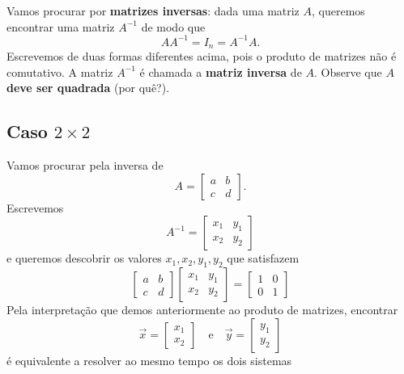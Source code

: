 Vamos procurar por \textbf{matrizes inversas}: dada uma matriz $A$, queremos encontrar uma matriz $A^{-1}$ de modo que
\begin{equation}
A A^{-1} = I_n = A^{-1} A.
\end{equation} Escrevemos de duas formas diferentes acima, pois o produto de matrizes não é comutativo. A matriz $A^{-1}$ é chamada a \textbf{matriz inversa} de $A$. Observe que  \textbf{$A$ deve ser quadrada} (por quê?).

\subsection{Caso $2\times 2$}

Vamos procurar pela inversa de
\begin{equation}
A = \left[
\begin{array}{cc}
a & b  \\
c & d 
\end{array}
\right].
\end{equation} Escrevemos
\begin{equation}
A^{-1} = \left[
\begin{array}{cc}
x_1 & y_1  \\
x_2 & y_2 
\end{array}
\right]
\end{equation} e queremos descobrir os valores $x_1, x_2, y_1, y_2$ que satisfazem
\begin{equation}
\left[
\begin{array}{cc}
a & b  \\
c & d 
\end{array}
\right]
\left[
\begin{array}{cc}
x_1 & y_1  \\
x_2 & y_2 
\end{array}
\right] =
\left[
\begin{array}{cc}
1 & 0 \\
0 & 1 
\end{array}
\right]
\end{equation} Pela interpretação que demos anteriormente ao produto de matrizes, encontrar
\begin{equation}
\vec{x} = \left[
\begin{array}{c}
x_1   \\
x_2  
\end{array}
\right] \quad \text{e} \quad
\vec{y} = \left[
\begin{array}{c}
y_1  \\
y_2 
\end{array}
\right]
\end{equation} é equivalente a resolver ao mesmo tempo os dois sistemas
